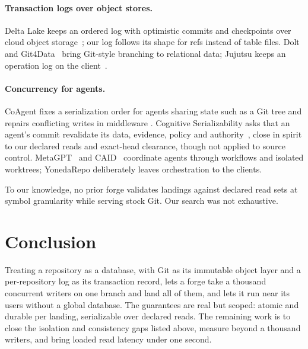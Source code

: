 \documentclass[11pt]{article}
\begin{document}
\paragraph{Transaction logs over object stores.} Delta Lake keeps an ordered log with
optimistic commits and checkpoints over cloud object storage~\cite{armbrust2020delta};
our log follows its shape for refs instead of table files. Dolt~\cite{dolt} and
Git4Data~\cite{gou2026git4data} bring Git-style branching to relational data; Jujutsu
keeps an operation log on the client~\cite{jujutsu}.

\paragraph{Concurrency for agents.} CoAgent fixes a serialization order for agents
sharing state such as a Git tree and repairs conflicting writes in middleware
\cite{lyu2026coagent}. Cognitive Serializability asks that an agent's commit revalidate
its data, evidence, policy and authority~\cite{he2026cognitive}, close in spirit to our
declared reads and exact-head clearance, though not applied to source control.
MetaGPT~\cite{hong2023metagpt} and CAID~\cite{caid2026} coordinate agents through
workflows and isolated worktrees; YonedaRepo deliberately leaves orchestration to the
clients.

To our knowledge, no prior forge validates landings against declared read sets at
symbol granularity while serving stock Git. Our search was not exhaustive.

\section{Conclusion}

Treating a repository as a database, with Git as its immutable object layer and a
per-repository log as its transaction record, lets a forge take a thousand concurrent
writers on one branch and land all of them, and lets it run near its users without a
global database. The guarantees are real but scoped: atomic and durable per landing,
serializable over declared reads. The remaining work is to close the isolation and
consistency gaps listed above, measure beyond a thousand writers, and bring loaded read
latency under one second.



\end{document}

